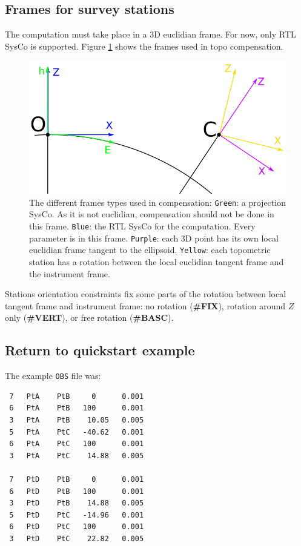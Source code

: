 \subsection{Frames for survey stations}

The computation must take place in a 3D euclidian frame. For now, only RTL SysCo is supported.
Figure \ref{fig:topoFrames} shows the frames used in topo compensation.

\begin{figure}[!h]
\centering
\includegraphics[width=12cm]{Programmer/framesTopo.png}
\caption{The different frames types used in compensation:
   \texttt{Green}: a projection SysCo. As it is not euclidian, compensation should not be done in this frame.
   \texttt{Blue}: the RTL SysCo for the computation. Every parameter is in this frame.
   \texttt{Purple}: each 3D point has its own local euclidian frame tangent to the ellipsoid.
   \texttt{Yellow}: each topometric station has a rotation between the local euclidian tangent frame and the instrument frame.
 }
\label{fig:topoFrames}
\end{figure}


Stations orientation constraints fix some parts of the rotation between local tangent frame and instrument frame:
no rotation (\textbf{\#FIX}), rotation around $Z$ only (\textbf{\#VERT}), or free rotation (\textbf{\#BASC}).



\subsection{Return to quickstart example}
The example \texttt{OBS} file was:
\begin{verbatim}
 7   PtA    PtB     0      0.001
 6   PtA    PtB   100      0.001
 3   PtA    PtB    10.05   0.005
 5   PtA    PtC   -40.62   0.001
 6   PtA    PtC   100      0.001
 3   PtA    PtC    14.88   0.005

 7   PtD    PtB     0      0.001
 6   PtD    PtB   100      0.001
 3   PtD    PtB    14.88   0.005
 5   PtD    PtC   -14.96   0.001
 6   PtD    PtC   100      0.001
 3   PtD    PtC    22.82   0.005
\end{verbatim}

